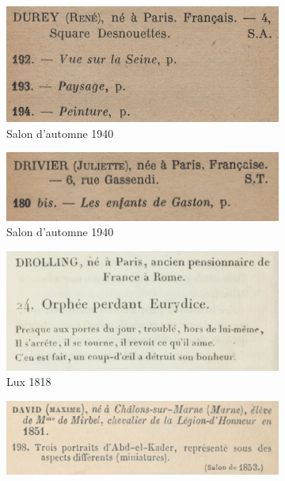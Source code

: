 \documentclass[a4paper,12pt,twoside]{book}
\begin{document}
\begin{figure}[ht]
	\begin{subfigure}{0.5\textwidth}
		\includegraphics[scale=0.5]{automne1940.png} 
		\centering
		\caption{Salon d'automne 1940}
	\end{subfigure}
	\begin{subfigure}{0.5\textwidth}
		\includegraphics[scale=0.5]{automne1940_2.png} 
		\centering
		\caption{Salon d'automne 1940}
	\end{subfigure}
	\begin{subfigure}{0.5\textwidth}
		\includegraphics[scale=0.4]{lux1818.png}
		\centering
		\caption{Lux 1818}
	\end{subfigure}
	\begin{subfigure}{0.5\textwidth}
		\includegraphics[scale=0.5]{lux1867.png}

\end{subfigure}
\end{figure}
\end{document}
